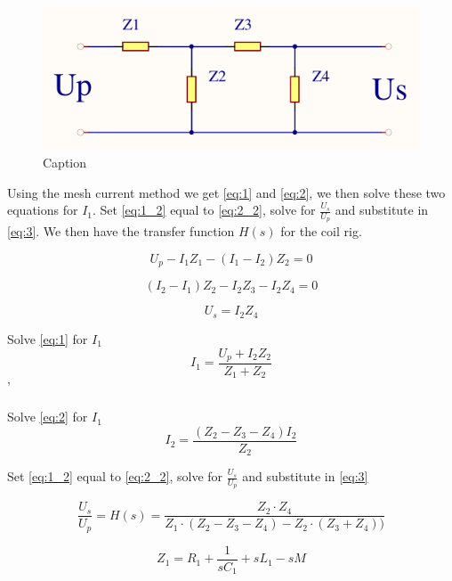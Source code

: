 \begin{figure}[h!]
    \centering
    \includegraphics[width=\textwidth]{Skjema/Spolerigg3.pdf}
    \caption{Caption}
    \label{fig:spolerigg3}
\end{figure}

Using the mesh current method we get \cref{eq:1} and \cref{eq:2}, we then solve these two equations for $I_1$. Set \cref{eq:1_2} equal to \cref{eq:2_2}, solve for $\frac{U_s}{U_p}$ and substitute in \cref{eq:3}. We then have the transfer function $H(s)$ for the coil rig.

\begin{equation} \label{eq:1}
    U_p - I_1 Z_1 - (I_1 - I_2) Z_2 = 0
\end{equation}

\begin{equation} \label{eq:2}
    (I_2 - I_1) Z_2 - I_2 Z_3 - I_2 Z_4 = 0
\end{equation}

\begin{equation} \label{eq:3}
    U_s = I_2 Z_4
\end{equation}

Solve \cref{eq:1} for $I_1$
\begin{equation} \label{eq:1_2}
    I_1 = \frac{U_p + I_2 Z_2}{Z_1 + Z_2}
\end{equation}'

Solve \cref{eq:2} for $I_1$
\begin{equation} \label{eq:2_2}
    I_2 = \frac{(Z_2 - Z_3 - Z_4) I_2}{Z_2}
\end{equation}

Set \cref{eq:1_2} equal to \cref{eq:2_2}, solve for $\frac{U_s}{U_p}$ and substitute in \cref{eq:3}

\begin{equation} \label{eq:3}
    \frac{U_s}{U_p} = H(s) = \frac{Z_2 \cdot Z_4}{Z_1 \cdot (Z_2 - Z_3 - Z_4) - Z_2 \cdot (Z_3 + Z_4))}
\end{equation}

\begin{equation} \label{eq:3_1}
    Z_1 = R_1 + \frac{1}{s C_1} + s L_1 - s M
\end{equation}

